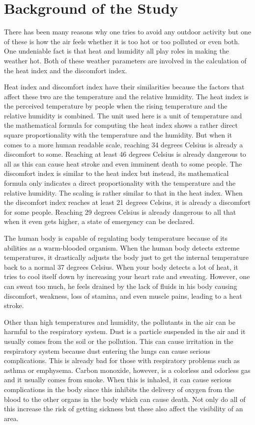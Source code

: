 \section{Background of the Study}

There has been many reasons why one tries to avoid any outdoor activity but one of these is how the air feels whether it is too hot or too polluted or even both. One undeniable fact is that heat and humidity all play roles in making the weather hot. Both of these weather parameters are involved in the calculation of the heat index and the discomfort index.
\par \noindent
Heat index and discomfort index have their similarities because the factors that affect these two are the temperature and the relative humidity. The heat index is the perceived temperature by people when the rising temperature and the relative humidity is combined. The unit used here is a unit of temperature and the mathematical formula for computing the heat index shows a rather direct square proportionality with the temperature and the humidity. But when it comes to a more human readable scale, reaching 34 degrees Celsius is already a discomfort to some. Reaching at least 46 degrees Celsius is already dangerous to all as this can cause heat stroke and even imminent death to some people. The discomfort index is similar to the heat index but instead, its mathematical formula only indicates a direct proportionality with the temperature and the relative humidity. The scaling is rather similar to that in the heat index. When the discomfort index reaches at least 21 degrees Celsius, it is already a discomfort for some people. Reaching 29 degrees Celsius is already dangerous to all that when it even gets higher, a state of emergency can be declared.
\par \noindent
The human body is capable of regulating body temperature because of its abilities as a warm-blooded organism. When the human body detects extreme temperatures, it drastically adjusts the body just to get the internal temperature back to a normal 37 degrees Celsius. When your body detects a lot of heat, it tries to cool itself down by increasing your heart rate and sweating. However, one can sweat too much, he feels drained by the lack of fluids in his body causing discomfort, weakness, loss of stamina, and even muscle pains, leading to a heat stroke.
\par \noindent
Other than high temperatures and humidity, the pollutants in the air can be harmful to the respiratory system. Dust is a particle suspended in the air and it usually comes from the soil or the pollution. This can cause irritation in the respiratory system because dust entering the lungs can cause serious complications. This is already bad for those with respiratory problems such as asthma or emphysema. Carbon monoxide, however, is a colorless and odorless gas and it usually comes from smoke. When this is inhaled, it can cause serious complications in the body since this inhibits the delivery of oxygen from the blood to the other organs in the body which can cause death. Not only do all of this increase the risk of getting sickness but these also affect the visibility of an area.
